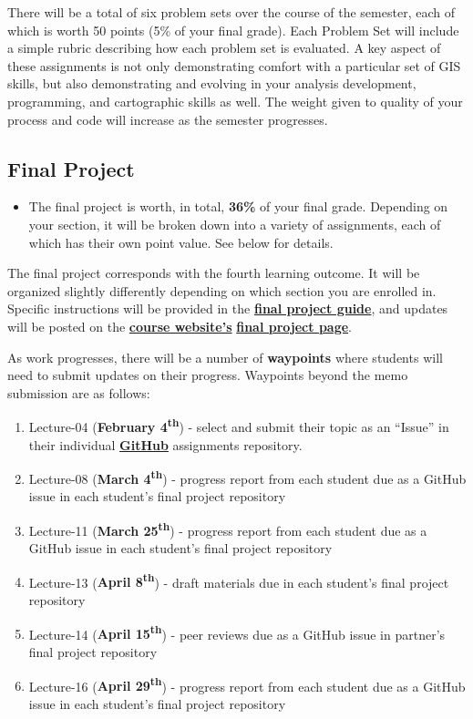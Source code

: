 \documentclass[]{book}
\providecommand{\tightlist}{%
  \setlength{\itemsep}{0pt}\setlength{\parskip}{0pt}}
\newenvironment{rmdblock}[1]
  {\begin{shaded*}
  \begin{itemize}
  \renewcommand{\labelitemi}{
    \raisebox{-.7\height}[0pt][0pt]{
      {\setkeys{Gin}{width=3em,keepaspectratio}\texttt{[image: images/\#1]}}
    }
  }
  \item
  }
  {
  \end{itemize}
  \end{shaded*}
  }
\newenvironment{rmdtip}
  {\begin{rmdblock}{tip}}
  {\end{rmdblock}}
\begin{document}
There will be a total of six problem sets over the course of the semester, each of which is worth 50 points (5\% of your final grade). Each Problem Set will include a simple rubric describing how each problem set is evaluated. A key aspect of these assignments is not only demonstrating comfort with a particular set of GIS skills, but also demonstrating and evolving in your analysis development, programming, and cartographic skills as well. The weight given to quality of your process and code will increase as the semester progresses.

\hypertarget{final-project}{%
\subsection{Final Project}\label{final-project}}

\begin{rmdtip}
The final project is worth, in total, \textbf{36\%} of your final grade.
Depending on your section, it will be broken down into a variety of
assignments, each of which has their own point value. See below for
details.
\end{rmdtip}

The final project corresponds with the fourth learning outcome. It will be organized slightly differently depending on which section you are enrolled in. Specific instructions will be provided in the \href{https://slu-soc5650.github.io/finalGuide}{\textbf{final project guide}}, and updates will be posted on the \href{https://slu-soc5650.github.io/}{\textbf{course website's}} \href{https://slu-soc5650.github.io/final-project}{\textbf{final project page}}.

As work progresses, there will be a number of \textbf{waypoints} where students will need to submit updates on their progress. Waypoints beyond the memo submission are as follows:

\begin{enumerate}
\def\labelenumi{\arabic{enumi}.}
\tightlist
\item
  Lecture-04 (\textbf{February 4\textsuperscript{th}}) - select and submit their topic as an ``Issue'' in their individual \href{https://github.com/slu-soc5650}{\textbf{GitHub}} assignments repository.
\item
  Lecture-08 (\textbf{March 4\textsuperscript{th}}) - progress report from each student due as a GitHub issue in each student's final project repository
\item
  Lecture-11 (\textbf{March 25\textsuperscript{th}}) - progress report from each student due as a GitHub issue in each student's final project repository
\item
  Lecture-13 (\textbf{April 8\textsuperscript{th}}) - draft materials due in each student's final project repository
\item
  Lecture-14 (\textbf{April 15\textsuperscript{th}}) - peer reviews due as a GitHub issue in partner's final project repository
\item
  Lecture-16 (\textbf{April 29\textsuperscript{th}}) - progress report from each student due as a GitHub issue in each student's final project repository
\end{enumerate}
\end{document}
